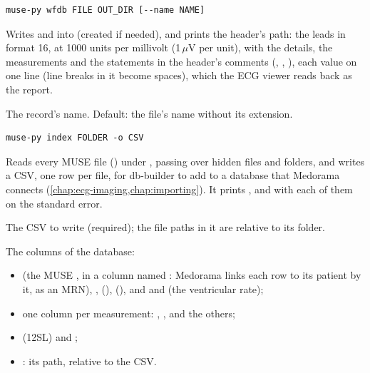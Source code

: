 \begin{lstlisting}[style=signature]
muse-py wfdb FILE OUT_DIR [--name NAME]
\end{lstlisting}
Writes  and  into  (created if needed), and prints
the header's path: the leads in format 16, at 1000 units per millivolt (1\,$\mu$V per unit), with
the details, the measurements and the statements in the header's comments (,
, ), each value on one line (line breaks in
it become spaces), which the ECG viewer reads back as the report.
\begin{params}
\item[--name NAME] The record's name. Default: the file's name without its extension.
\end{params}

\begin{lstlisting}[style=signature]
muse-py index FOLDER -o CSV
\end{lstlisting}
Reads every MUSE file () under , passing over hidden files and folders,
and writes a CSV, one row per file, for db-builder to add to a database that Medorama connects
(\cref{chap:ecg-imaging,chap:importing}). It prints , and
 with each of them on the standard error.
\begin{params}
\item[-o, --output CSV] The CSV to write (required); the file paths in it are relative to its
  folder.
\end{params}

The columns of the database:
\begin{itemize}
\item {} (the MUSE , in a column named :
  Medorama links each row to its patient by it, as an MRN), , 
  (),  (), and  and  (the
  ventricular rate);
\item one column per measurement: , ,  and the others;
\item {} (12SL) and ;
\item {}: its path, relative to the CSV.
\end{itemize}

